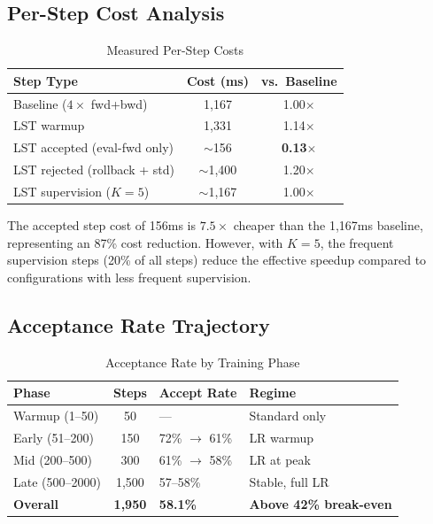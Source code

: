 \documentclass[conference]{IEEEtran}
\begin{document}
\subsection{Per-Step Cost Analysis}

\begin{table}[h]
\centering
\caption{Measured Per-Step Costs}
\label{tab:step_costs}
\begin{tabular}{@{}lcc@{}}
\toprule
\textbf{Step Type} & \textbf{Cost (ms)} & \textbf{vs.\ Baseline} \\
\midrule
Baseline ($4\times$ fwd+bwd) & 1,167 & 1.00$\times$ \\
LST warmup & 1,331 & 1.14$\times$ \\
LST accepted (eval-fwd only) & $\sim$156 & \textbf{0.13$\times$} \\
LST rejected (rollback + std) & $\sim$1,400 & 1.20$\times$ \\
LST supervision ($K{=}5$) & $\sim$1,167 & 1.00$\times$ \\
\bottomrule
\end{tabular}
\end{table}

The accepted step cost of 156ms is $7.5\times$ cheaper than the 1,167ms baseline, representing an 87\% cost reduction. However, with $K{=}5$, the frequent supervision steps (20\% of all steps) reduce the effective speedup compared to configurations with less frequent supervision.

\subsection{Acceptance Rate Trajectory}

\begin{table}[h]
\centering
\caption{Acceptance Rate by Training Phase}
\label{tab:acceptance_trajectory}
\begin{tabular}{@{}lcll@{}}
\toprule
\textbf{Phase} & \textbf{Steps} & \textbf{Accept Rate} & \textbf{Regime} \\
\midrule
Warmup (1--50) & 50 & --- & Standard only \\
Early (51--200) & 150 & 72\% $\rightarrow$ 61\% & LR warmup \\
Mid (200--500) & 300 & 61\% $\rightarrow$ 58\% & LR at peak \\
Late (500--2000) & 1,500 & 57--58\% & Stable, full LR \\
\midrule
\textbf{Overall} & \textbf{1,950} & \textbf{58.1\%} & \textbf{Above 42\% break-even} \\
\bottomrule
\end{tabular}
\end{table}
\end{document}
